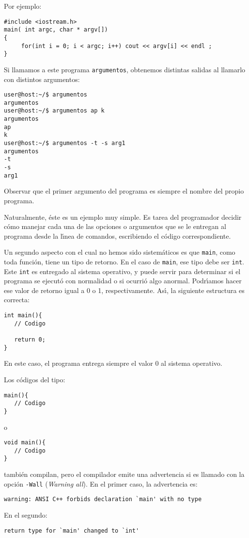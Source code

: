 Por ejemplo:
\begin{verbatim}
#include <iostream.h>
main( int argc, char * argv[])
{
     for(int i = 0; i < argc; i++) cout << argv[i] << endl ;
}
\end{verbatim}
Si llamamos a este programa \verb+argumentos+, obtenemos 
distintas salidas al llamarlo con distintos argumentos:
\begin{verbatim}
user@host:~/$ argumentos 
argumentos
user@host:~/$ argumentos ap k
argumentos
ap
k
user@host:~/$ argumentos -t -s arg1
argumentos
-t
-s
arg1
\end{verbatim}
Observar que el primer argumento del programa es siempre el nombre del
propio programa.

Naturalmente, \'este es un ejemplo muy simple. Es tarea del
programador decidir c\'omo manejar cada una de las opciones o
argumentos que se le entregan al programa desde la l\'{\i}nea de
comandos, escribiendo el c\'odigo correspondiente.

\vspace{.3cm}
Un segundo aspecto con el cual no hemos sido sistem\'aticos es que
\verb+main+, como toda funci\'on, tiene un tipo de retorno. En el caso
de \verb+main+, ese tipo debe ser \verb+int+. Este \verb+int+ es
entregado al sistema operativo, y puede servir para determinar si el
programa se ejecut\'o con normalidad o si ocurri\'o algo
anormal. Podr\'{\i}amos hacer ese valor de retorno igual a 0 o 1,
respectivamente. As\'{\i}, la siguiente estructura es correcta:
\begin{verbatim}
int main(){
   // Codigo
   
   return 0;
} 
\end{verbatim}
En este caso, el programa entrega siempre el valor 0 al sistema
operativo. 

Los c\'odigos del tipo:
\begin{verbatim}
main(){
   // Codigo
}
\end{verbatim}
o 
\begin{verbatim}
void main(){
   // Codigo
}
\end{verbatim}
tambi\'en compilan, pero el compilador emite una advertencia si es
llamado con la opci\'on \verb+-Wall+ ({\it Warning all\/}). En el primer
caso, la advertencia es:
\begin{verbatim}
warning: ANSI C++ forbids declaration `main' with no type
\end{verbatim}
En el segundo:
\begin{verbatim}
return type for `main' changed to `int'
\end{verbatim}

